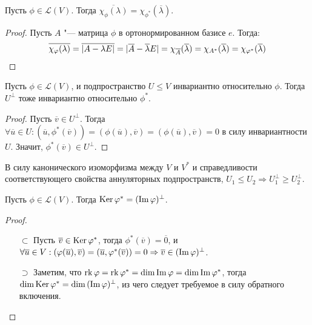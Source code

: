 \begin{proposition}
	Пусть $\phi \in \mathcal{L}(V)$. Тогда $\overline{\chi_\phi(\lambda)} = \chi_{\phi^*}(\overline{\lambda})$.
\end{proposition}

\begin{proof}
	Пусть $A$ "--- матрица $\phi$ в ортонормированном базисе $e$. Тогда:
	\[\overline{\chi_\phi(\lambda)} = \overline{|A - \lambda E|} = |\overline{A} - \overline{\lambda}E| = \chi_{\overline{A}}(\overline{\lambda}) = \chi_{A^*}(\overline{\lambda}) = \chi_{\phi^*}(\overline{\lambda})\qedhere\]
\end{proof}

\begin{proposition}
	Пусть $\phi \in \mathcal{L}(V)$, и подпространство $U \le V$ инвариантно относительно $\phi$. Тогда $U^\perp$ тоже инвариантно относительно $\phi^*$.
\end{proposition}

\begin{proof}
	Пусть $\overline{v} \in U^\perp$. Тогда $\forall \overline{u} \in U: (\overline{u}, \phi^*(\overline{v})) = (\phi(\overline{u}), \overline{v}) = (\phi(\overline{u}), \overline{v}) = 0$ в силу инвариантности $U$. Значит, $\phi^*(\overline{v}) \in U^\perp$.
\end{proof}

\begin{note}
	В силу канонического изоморфизма между $V$ и $V^*$ и справедливости соответствующего свойства аннуляторных подпространств, $U_1 \le U_2 \Rightarrow U_1^\perp \ge U_2^\perp$.
\end{note}

\begin{theorem}[Фредгольма]
	Пусть $\phi \in \mathcal{L}(V)$. Тогда $\ke{\phi^*} \hm{=} (\im{\phi})^\perp$.
\end{theorem}

\begin{proof}~
	\begin{itemize}
		\item[$\subset$] Пусть $\overline{v} \in \ke{\phi^*}$, тогда $\phi^*(\overline{v}) = \overline{0}$, и $\forall \overline{u} \in V: (\phi(\overline{u}), \overline{v}) \hm{=} (\overline{u}, \phi^*(\overline{v})) = 0 \ra \overline{v} \in (\im{\phi})^\perp$.
		
		\item[$\supset$] Заметим, что $\rk{\phi} = \rk{\phi^*} = \dim{\im{\phi}} = \dim{\im{\phi^*}}$, тогда $\dim{\ke{\phi^*}} = \dim{(\im{\phi})^\perp}$, из чего следует требуемое в силу обратного включения.\qedhere
	\end{itemize}
\end{proof}

